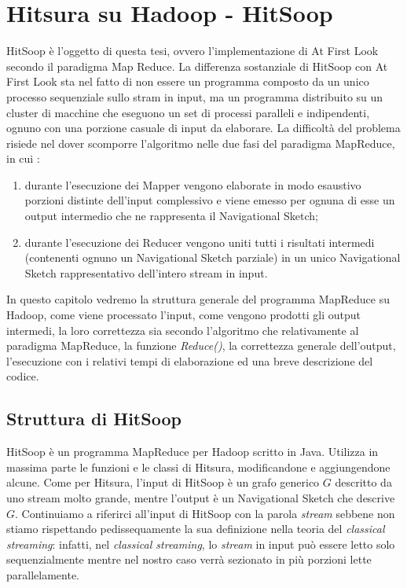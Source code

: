 \documentclass[a4paper,11pt]{report}
\begin{document}
\chapter{Hitsura su Hadoop - HitSoop}
HitSoop è l'oggetto di questa tesi, ovvero l'implementazione di At First Look secondo il paradigma Map Reduce.
La differenza sostanziale di HitSoop con At First Look sta nel fatto di non essere un programma composto da un unico processo sequenziale
sullo stram in input, ma un programma 
distribuito su un cluster di macchine che eseguono un set di processi paralleli e indipendenti, ognuno con una porzione casuale di input da
elaborare. 
La difficoltà del problema risiede nel dover scomporre l'algoritmo nelle due fasi del paradigma MapReduce, in cui :
\begin{enumerate}
 \item durante l'esecuzione dei Mapper vengono elaborate in modo esaustivo porzioni distinte dell'input complessivo e viene emesso per
ognuna di esse un output intermedio 
che ne rappresenta il Navigational Sketch;
 \item durante l'esecuzione dei Reducer vengono uniti tutti i risultati intermedi (contenenti ognuno un Navigational Sketch parziale) in un
unico Navigational Sketch rappresentativo dell'intero
stream in input.
\end{enumerate}
In questo capitolo vedremo la struttura generale del programma MapReduce su Hadoop, come viene processato l'input, come vengono prodotti gli
output intermedi, la loro correttezza sia 
secondo l'algoritmo che relativamente al paradigma MapReduce, la funzione \emph{Reduce()}, la correttezza generale dell'output, l'esecuzione
con i relativi tempi di elaborazione ed
 una breve descrizione del codice.

\section{Struttura di HitSoop}
HitSoop è un programma MapReduce per Hadoop scritto in Java. Utilizza in massima parte le funzioni e le classi di Hitsura, modificandone e
aggiungendone alcune. Come per Hitsura, l'input di HitSoop
è un grafo generico $G$ descritto da uno stream molto grande, mentre l'output è un Navigational Sketch che descrive $G$. Continuiamo a
riferirci all'input di HitSoop con la parola 
\emph{stream} sebbene non stiamo rispettando pedissequamente la sua definizione nella teoria del \emph{classical streaming}: infatti, nel
\emph{classical streaming}, lo \emph{stream} in input 
può essere letto solo sequenzialmente mentre nel nostro caso verrà sezionato in più porzioni lette parallelamente.
\end{document}
